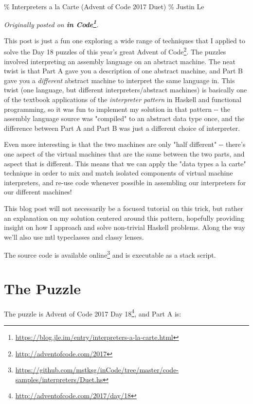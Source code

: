 \documentclass[]{article}
\renewcommand{\href}[2]{#2\footnote{\url{#1}}}
\begin{document}
\% Interpreters a la Carte (Advent of Code 2017 Duet) \% Justin Le

\emph{Originally posted on
\textbf{\href{https://blog.jle.im/entry/interpreters-a-la-carte.html}{in
Code}}.}

This post is just a fun one exploring a wide range of techniques that I applied
to solve the Day 18 puzzles of this year's great
\href{http://adventofcode.com/2017}{Advent of Code}. The puzzles involved
interpreting an assembly language on an abstract machine. The neat twist is that
Part A gave you a description of one abstract machine, and Part B gave you a
\emph{different} abstract machine to interpret the same language in. This twist
(one language, but different interpreters/abstract machines) is basically one of
the textbook applications of the \emph{interpreter pattern} in Haskell and
functional programming, so it was fun to implement my solution in that pattern
-\/- the assembly language source was "compiled" to an abstract data type once,
and the difference between Part A and Part B was just a different choice of
interpreter.

Even more interesting is that the two machines are only "half different" -\/-
there's one aspect of the virtual machines that are the same between the two
parts, and aspect that is different. This means that we can apply the "data
types a la carte" technique in order to mix and match isolated components of
virtual machine interpreters, and re-use code whenever possible in assembling
our interpreters for our different machines!

This blog post will not necessarily be a focused tutorial on this trick, but
rather an explanation on my solution centered around this pattern, hopefully
providing insight on how I approach and solve non-trivial Haskell problems.
Along the way we'll also use mtl typeclasses and classy lenses.

The source code is
\href{https://github.com/mstksg/inCode/tree/master/code-samples/interpreters/Duet.hs}{available
online} and is executable as a stack script.

\section{The Puzzle}

The puzzle is \href{http://adventofcode.com/2017/day/18}{Advent of Code 2017 Day
18}, and Part A is:
\end{document}
